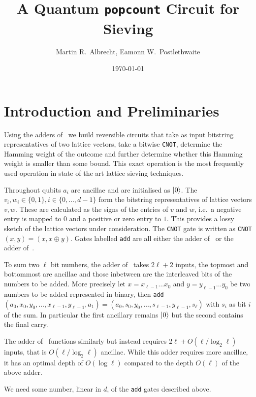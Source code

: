 \documentclass[notitlepage]{article}
\title{A Quantum \texttt{popcount} Circuit for Sieving}
\author{Martin R.~Albrecht, Eamonn W.~Postlethwaite}
\date{\today}
\theoremstyle{definition}
\begin{document}
\maketitle

\section*{Introduction and Preliminaries}

Using the adders of~\cite{cuccaro2004new,Takahashi:2008:FQC} we build reversible circuits that take as input bitstring representatives of two lattice vectors, take a bitwise \texttt{CNOT}, determine the Hamming weight of the outcome and further determine whether this Hamming weight is smaller than some bound. This exact operation is the most frequently used operation in state of the art lattice sieving techniques.

Throughout qubits $a_{i}$ are ancillae and are initialised as $\ket{0}$.
The $v_{i}, w_{i} \in \{0, 1\}, i \in \{0, \dots, d - 1\}$ form the bitstring representatives of lattice vectors $v, w$.
These are calculated as the signs of the entries of $v$ and $w$, i.e.~a negative entry is mapped to $0$ and a positive or zero entry to $1$.
This provides a lossy sketch of the lattice vectors under consideration.
The \texttt{CNOT} gate is written as \texttt{CNOT}$(x, y) = (x, x \oplus y)$.
Gates labelled \texttt{add} are all either the adder of~\cite{cuccaro2004new} or the adder of~\cite{Takahashi:2008:FQC}.

To sum two $\ell$ bit numbers, the adder of~\cite{cuccaro2004new} takes $2\ell + 2$ inputs, the topmost and bottommost are ancillae and those inbetween are the interleaved bits of the numbers to be added.
More precisely let $x = x_{\ell-1}\dots x_{0}$ and $y = y_{\ell-1}\dots y_{0}$ be two numbers to be added represented in binary, then \texttt{add}$(a_{0}, x_{0}, y_{0}, \dots, x_{\ell-1}, y_{\ell-1}, a_{1}) = (a_{0}, s_{0}, y_{0}, \dots, s_{\ell-1}, y_{\ell-1}, s_{\ell})$ with $s_{i}$ as bit $i$ of the sum.
In particular the first ancillary remains $\ket{0}$ but the second contains the final carry.

The adder of~\cite{Takahashi:2008:FQC} functions similarly but instead requires $2\ell + O(\ell/\log_{2}\ell)$ inputs, that is $O(\ell/\log_{2}\ell)$ ancillae.
While this adder requires more ancillae, it has an optimal depth of $O(\log\ell)$ compared to the depth $O(\ell)$ of the above adder.

We need some number, linear in $d$, of the \texttt{add} gates described above.
\end{document}
